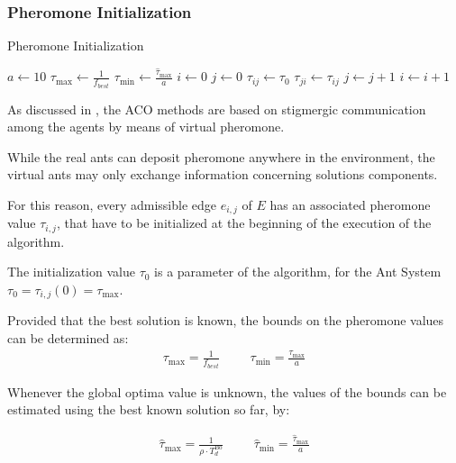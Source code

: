 \begin{homeworkProblem}
\subsubsection{Pheromone Initialization}
\begin{algorithm}[!h]
  \caption{Pheromone Initialization}\label{init}
  \begin{algorithmic}[1]
      \State $a \gets 10$
      \State $\tau_{\max} \gets \frac{1}{f_{best}}$
      \State $\tau_{\min} \gets \frac{\hat{\tau}_{\max}}{a}$
      \State $i \gets 0$
      \State $j \gets 0$
          \State $\tau_{ij} \gets \tau_0$
          \State $\tau_{ji} \gets \tau_{ij}$
          \State $ j \gets j + 1$  
        \EndFor
        \State $ i \gets i + 1$ 
      \EndFor
    \EndProcedure
\end{algorithmic}
\end{algorithm}

As discussed in , the ACO methods are based on stigmergic communication among the agents by means of virtual pheromone.

While the real ants can deposit pheromone anywhere in the environment, the virtual ants may only exchange information concerning solutions components.

For this reason, every admissible edge $e_{i,j}$ of $E$ has an associated pheromone value $\tau_{i,j}$, that have to be initialized at the beginning of the execution of the algorithm.

The initialization value $\tau_0$ is a parameter of the algorithm, for the \maxmin Ant System $\tau_0 = \tau_{i,j}(0) = \tau_{\max}$. 

Provided that the best solution is known, the bounds on the pheromone values can be determined as:
\begin{equation}
\begin{array}{lccr}
  \tau_{\max} = \frac{1}{f_{best}} & & & \tau_{\min} = \frac{\tau_{\max}}{a}
\end{array}
\end{equation}

Whenever the global optima value is unknown, the values of the bounds can be estimated using the best known solution so far, by:

\begin{equation}
\begin{array}{lccr}
  \hat{\tau}_{\max} = \frac{1}{\rho \cdot T_{d}^{\text{Bo}}} & & & \hat{\tau}_{\min} = \frac{\hat{\tau}_{\max}}{a}
\end{array}
\end{equation}


\end{homeworkProblem}

